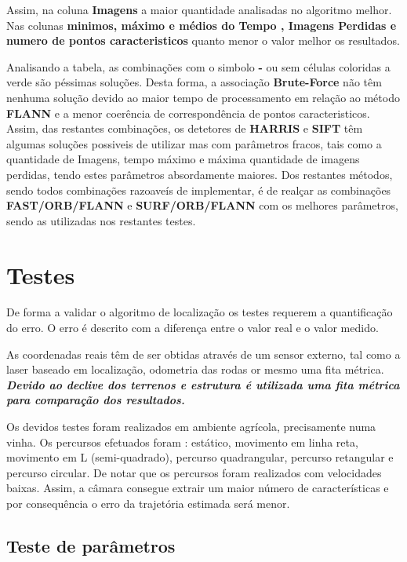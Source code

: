 Assim, na coluna \textbf{Imagens} a maior quantidade analisadas no algoritmo melhor. Nas colunas \textbf{minimos, máximo e médios do Tempo , Imagens Perdidas e numero de pontos caracteristicos} quanto menor o valor melhor os resultados. 

Analisando a tabela, as combinações com o simbolo \textbf{-} ou sem células coloridas a verde são péssimas soluções. Desta forma, a associação \textbf{Brute-Force} não têm nenhuma solução devido ao maior tempo de processamento em relação ao método \textbf{FLANN} e a menor coerência de correspondência de pontos caracteristicos. Assim, das restantes combinações, os detetores de \textbf{HARRIS} e \textbf{SIFT} têm algumas soluções possiveis de utilizar mas com parâmetros fracos, tais como a quantidade de Imagens, tempo máximo e máxima quantidade de imagens perdidas, tendo estes parâmetros absordamente maiores. Dos restantes métodos, sendo todos combinações razoaveís de implementar, é de realçar as combinações \textbf{FAST/ORB/FLANN} e \textbf{SURF/ORB/FLANN} com os melhores parâmetros, sendo as utilizadas nos restantes testes.





\section{Testes}

De forma a validar o algoritmo de localização os testes requerem a quantificação do erro. O erro é descrito com a diferença entre o valor real e o valor medido.

As coordenadas reais têm de ser obtidas através de um sensor externo, tal como a laser baseado em localização, odometria das rodas or mesmo uma fita métrica. \textbf{\textit{Devido ao declive dos terrenos e estrutura é utilizada uma fita métrica para comparação dos resultados.}}

Os devidos testes foram realizados em ambiente agrícola, precisamente numa vinha. Os percursos efetuados foram : estático, movimento em linha reta, movimento em L (semi-quadrado), percurso quadrangular, percurso retangular e percurso circular. De notar que os percursos foram realizados com velocidades baixas. Assim, a câmara consegue extrair um maior número de características e por consequência o erro da trajetória estimada será menor.  


\subsection{Teste de parâmetros}


